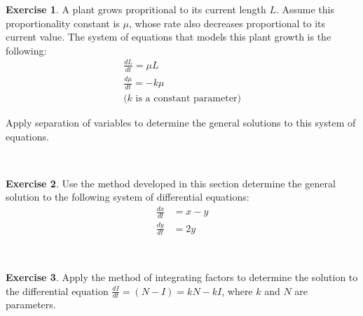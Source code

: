 \documentclass[
]{book}
\theoremstyle{definition}
\theoremstyle{definition}
\theoremstyle{definition}
\newtheorem{exercise}{Exercise}[chapter]
\theoremstyle{remark}
\begin{document}
\begin{exercise}
\protect\hypertarget{exr:unnamed-chunk-126}{}{\label{exr:unnamed-chunk-126} }A plant grows propritional to its current length \(L\). Assume this proportionality constant is \(\mu\), whose rate also decreases proportional to its current value. The system of equations that models this plant growth is the following:
\begin{align}  
\frac{dL}{dt}  = \mu L \\ 
\frac{d\mu}{dt}  = -k \mu \\
 \mbox{($k$ is a constant parameter)}
\end{align}

Apply separation of variables to determine the general solutions to this system of equations.
\end{exercise}

~

\begin{exercise}
\protect\hypertarget{exr:unnamed-chunk-127}{}{\label{exr:unnamed-chunk-127} }Use the method developed in this section determine the general solution to the following system of differential equations:
\begin{align}
\frac{dx}{dt} &= x-y   \\
\frac{dy}{dt} & = 2y
\end{align}
\end{exercise}

~

\begin{exercise}
\protect\hypertarget{exr:unnamed-chunk-128}{}{\label{exr:unnamed-chunk-128} }Apply the method of integrating factors to determine the solution to the differential equation \(\displaystyle \frac{dI}{dt} = (N-I) = kN - kI\), where \(k\) and \(N\) are parameters.
\end{exercise}

~
\end{document}

